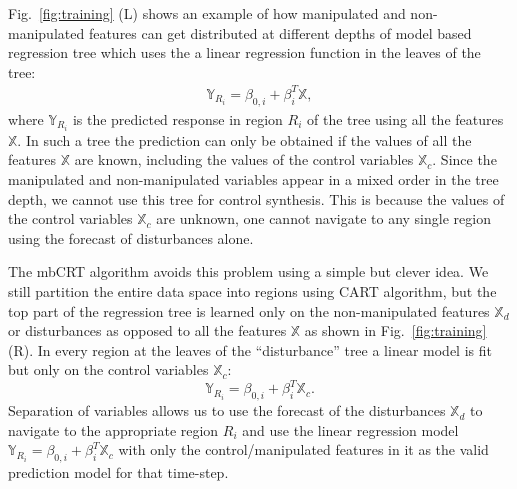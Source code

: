 Fig.~\ref{fig:training} (L) shows an example of how manipulated and non-manipulated features can get distributed at different depths of model based regression tree which uses the a linear regression function in the leaves of the tree:
\begin{gather}
\mathbb{Y}_{R_i} = \beta_{0,i} + \beta^T_i \mathbb{X},
\label{eq:linear_regression_leaf}
\end{gather}
where $\mathbb{Y}_{R_i}$ is the predicted response in region $R_i$ of the tree using all the features $\mathbb{X}$. 
 In such a tree the prediction can only be obtained if the values of all the features $\mathbb{X}$ are known, including the values of the control variables $\mathbb{X}_c$. 
Since the manipulated and non-manipulated variables appear in a mixed order in the tree depth, we cannot use this tree for control synthesis.
This is because the values of the control variables $\mathbb{X}_{c}$ are unknown, one cannot navigate to any single region using the forecast of disturbances alone. 

The mbCRT algorithm avoids this problem using a simple but clever idea. We still partition the entire data space into regions using CART algorithm, but the top part of the regression tree is learned only on the non-manipulated features $\mathbb{X}_d$ or disturbances as opposed to all the features $\mathbb{X}$ as shown in Fig.~\ref{fig:training} (R).
In every region at the leaves of the ``disturbance'' tree a linear model is fit but only on the control variables $\mathbb{X}_c$:
\begin{equation}
\mathbb{Y}_{R_i} = \beta_{0,i} + \beta^T_i \mathbb{X}_c.
\label{eq:control_leaf}
\end{equation}
Separation of variables allows us to use the forecast of the disturbances $\mathbb{X}_d$ to navigate to the appropriate region $R_i$ and use the linear regression model $\mathbb{Y}_{R_i} = \beta_{0,i} + \beta^T_i \mathbb{X}_c$ with only the control/manipulated features in it as the valid prediction model for that time-step.

